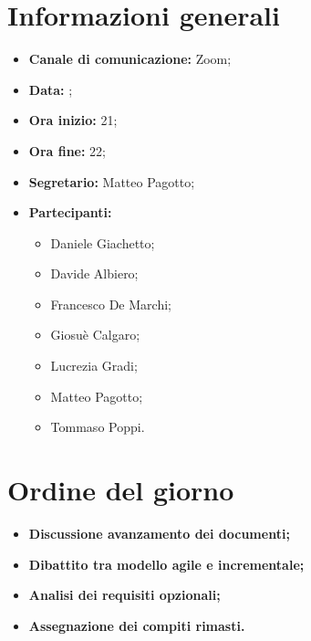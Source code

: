 \section{Informazioni generali}

\begin{itemize}

	\item \textbf{Canale di comunicazione:} Zoom;
	
	\item \textbf{Data:} \DataMeeting{};
	
	\item \textbf{Ora inizio:} 21;
	
	\item \textbf{Ora fine:} 22;
	
	\item \textbf{Segretario:} Matteo Pagotto;
	
	\item \textbf{Partecipanti:}
	
		\begin{itemize}
		
			\item Daniele Giachetto;
			\item Davide Albiero;
			\item Francesco De Marchi;
			\item Giosuè Calgaro;
			\item Lucrezia Gradi;
			\item Matteo Pagotto;
			\item Tommaso Poppi.
				 
		\end{itemize}

\end{itemize}

\section{Ordine del giorno}

\begin{itemize}

	
	
	\item\textbf{Discussione avanzamento dei documenti;}
	
	\item\textbf{Dibattito tra modello agile e incrementale;}
	
	\item\textbf{Analisi dei requisiti opzionali;}

	\item\textbf{Assegnazione dei compiti rimasti.}

\end{itemize}

